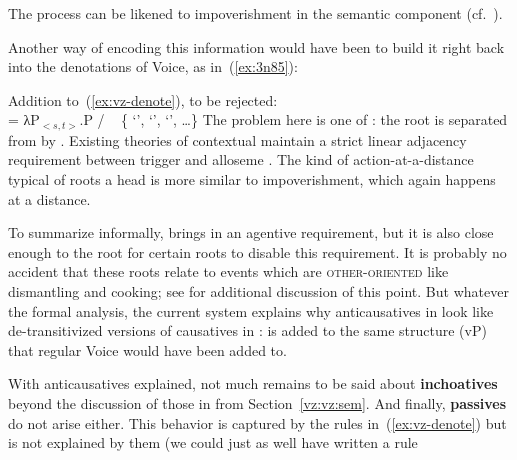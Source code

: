 \begin{exe}
\begin{xlist}
\begin{xlist}
\begin{exe}
\begin{xlist}
\begin{xlist}
\begin{exe}
\begin{xlist}
\begin{xlist}
\begin{exe}
\begin{exe}
\begin{xlist}
\begin{exe}
\begin{exe}
\begin{xlist}
\begin{exe}
\begin{exe}
\begin{exe}
\begin{exe}
\begin{exe}
\begin{xlist}
\begin{exe}
\begin{xlist}
\begin{exe}
\begin{exe}
\begin{xlist}
\begin{exe}
\begin{xlist}
\begin{exe}
\begin{exe}
\begin{exe}
\begin{xlist}
\begin{exe}
\begin{exe}
\begin{exe}
\begin{xlist}
\begin{exe}
\begin{xlist}
\begin{exe}
\begin{xlist}
\begin{exe}
\begin{xlist}
\begin{exe}
\begin{exe}
\begin{exe}
\begin{exe}
\begin{xlist}
\begin{exe}
\begin{xlist}
\begin{exe}
\begin{xlist}
\begin{exe}
\begin{xlist}
\begin{exe}
\begin{xlist}
\begin{exe}
\begin{xlist}
\begin{exe}
\begin{exe}
\begin{exe}
\begin{exe}
\begin{xlist}
\begin{exe}
\begin{xlist}
\begin{exe}
\begin{xlist}
\begin{exe}
\begin{exe}
\begin{xlist}
\begin{exe}
\begin{exe}
\begin{exe}
\begin{exe}
\begin{xlist}
\begin{xlist}
\begin{exe}
\begin{xlist}
\begin{exe}
\begin{exe}
\begin{exe}
\begin{xlist}
\begin{exe}
\begin{exe}
\begin{xlist}
\begin{exe}
\begin{exe}
\begin{exe}
\begin{xlist}
\begin{xlist}
\begin{exe}
\begin{xlist}
\begin{exe}
\begin{exe}
\begin{exe}
\begin{exe}
\begin{xlist}
\begin{exe}
\begin{xlist}
\begin{exe}
\begin{xlist}
\begin{exe}
The process can be likened to impoverishment \citep{bonet91,noyer98} in the semantic component (cf.~\citealt{nevins15roots}).

Another way of encoding this information would have been to build it right back into the denotations of Voice, as in~(\ref{ex:3n85}):
 \begin{exe}
\ex  \label{ex:3n85}Addition to~(\ref{ex:vz-denote}), to be rejected: \\
	\denote{\vz} = λP$_{<s,t>}$.P / \trace~{\va} \{ `',  `',  `', \dots\}
 \z 
The problem here is one of : the root is separated from {\vz} by {\va}. Existing theories of contextual  maintain a strict linear adjacency requirement between trigger and alloseme \citep{marantz13,kastner16phd}. The kind of action-at-a-distance typical of roots  a head is more similar to impoverishment, which again happens at a distance.

To summarize informally, {\va} brings in an agentive requirement, but it is also close enough to the root for certain roots to disable this requirement. It is probably no accident that these roots relate to events which are \textsc{other-oriented} like dismantling and cooking; see \cite{kastner17gjgl} for additional discussion of this point. But whatever the formal analysis, the current system explains why anticausatives in {\thit} look like de-transitivized versions of causatives in {\tpie}: {\vz} is added to the same structure (vP) that regular Voice would have been added to.

With anticausatives explained, not much remains to be said about \textbf{inchoatives} beyond the discussion of those in {\tnif} from Section~\ref{vz:vz:sem}. And finally, \textbf{passives} do not arise either. This behavior is captured by the rules in~(\ref{ex:vz-denote}) but is not explained by them (we could just as well have written a rule 
\end{exe}
\end{exe}
\end{xlist}
\end{exe}
\end{xlist}
\end{exe}
\end{xlist}
\end{exe}
\end{exe}
\end{exe}
\end{exe}
\end{xlist}
\end{exe}
\end{xlist}
\end{xlist}
\end{exe}
\end{exe}
\end{exe}
\end{xlist}
\end{exe}
\end{exe}
\end{xlist}
\end{exe}
\end{exe}
\end{exe}
\end{xlist}
\end{exe}
\end{xlist}
\end{xlist}
\end{exe}
\end{exe}
\end{exe}
\end{exe}
\end{xlist}
\end{exe}
\end{exe}
\end{xlist}
\end{exe}
\end{xlist}
\end{exe}
\end{xlist}
\end{exe}
\end{exe}
\end{exe}
\end{exe}
\end{xlist}
\end{exe}
\end{xlist}
\end{exe}
\end{xlist}
\end{exe}
\end{xlist}
\end{exe}
\end{xlist}
\end{exe}
\end{xlist}
\end{exe}
\end{exe}
\end{exe}
\end{exe}
\end{xlist}
\end{exe}
\end{xlist}
\end{exe}
\end{xlist}
\end{exe}
\end{xlist}
\end{exe}
\end{exe}
\end{exe}
\end{xlist}
\end{exe}
\end{exe}
\end{exe}
\end{xlist}
\end{exe}
\end{xlist}
\end{exe}
\end{exe}
\end{xlist}
\end{exe}
\end{xlist}
\end{exe}
\end{exe}
\end{exe}
\end{exe}
\end{exe}
\end{xlist}
\end{exe}
\end{exe}
\end{xlist}
\end{exe}
\end{exe}
\end{xlist}
\end{xlist}
\end{exe}
\end{xlist}
\end{xlist}
\end{exe}
\end{xlist}
\end{xlist}
\end{exe}
